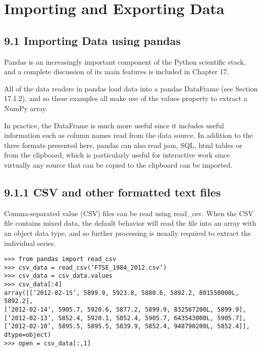 \section{Importing and Exporting Data}

\subsection{9.1 Importing Data using pandas}

Pandas is an increasingly important component of the Python scientific stack, and a complete discussion
of its main features is included in Chapter 17. 

All of the data readers in pandas load data into a pandas
DataFrame (see Section 17.1.2), and so these examples all make use of the values property to extract a
NumPy array. 

In practice, the DataFrame is much more useful since it includes useful information such
as column names read from the data source. In addition to the three formats presented here, pandas can
also read json, SQL, html tables or from the clipboard, which is particularly useful for interactive work
since virtually any source that can be copied to the clipboard can be imported.

\subsection{9.1.1 CSV and other formatted text files}

Comma-separated value (CSV) files can be read using read_csv. When the CSV file contains mixed data,
the default behavior will read the file into an array with an object data type, and so further processing is
usually required to extract the individual series.

\begin{framed}
\begin{verbatim}
>>> from pandas import read_csv
>>> csv_data = read_csv(’FTSE_1984_2012.csv’)
>>> csv_data = csv_data.values
>>> csv_data[:4]
array([[’2012-02-15’, 5899.9, 5923.8, 5880.6, 5892.2, 801550000L, 5892.2],
[’2012-02-14’, 5905.7, 5920.6, 5877.2, 5899.9, 832567200L, 5899.9],
[’2012-02-13’, 5852.4, 5920.1, 5852.4, 5905.7, 643543000L, 5905.7],
[’2012-02-10’, 5895.5, 5895.5, 5839.9, 5852.4, 948790200L, 5852.4]], dtype=object)
>>> open = csv_data[:,1]
\end{verbatim}
\end{framed}


